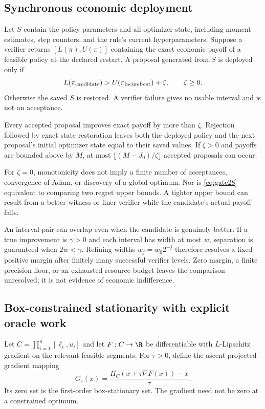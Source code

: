\subsection{Synchronous economic deployment}
Let $S$ contain the policy parameters and all optimizer state, including moment estimates, step counters, and the rule's current hyperparameters. Suppose a verifier returns $[L(\pi),U(\pi)]$ containing the exact economic payoff of a feasible policy at the declared restart. A proposal generated from $S$ is deployed only if
\begin{equation}\label{eq:gate28}
 L(\pi_{\rm candidate})>U(\pi_{\rm incumbent})+\zeta,
 \qquad\zeta\ge0.
\end{equation}
Otherwise the saved $S$ is restored. A verifier failure gives no usable interval and is not an acceptance.
\begin{proposition}\label{prop:gate28}
Every accepted proposal improves exact payoff by more than $\zeta$. Rejection followed by exact state restoration leaves both the deployed policy and the next proposal's initial optimizer state equal to their saved values. If $\zeta>0$ and payoffs are bounded above by $M$, at most $\lfloor(M-J_0)/\zeta\rfloor$ accepted proposals can occur.
\end{proposition}
For $\zeta=0$, monotonicity does not imply a finite number of acceptances, convergence of Adam, or discovery of a global optimum. Nor is \eqref{eq:gate28} equivalent to comparing two regret upper bounds. A tighter upper bound can result from a better witness or finer verifier while the candidate's actual payoff falls.

An interval pair can overlap even when the candidate is genuinely better. If a true improvement is $\gamma>0$ and each interval has width at most $w$, separation is guaranteed when $2w<\gamma$. Refining widths $w_j=w_0 2^{-j}$ therefore resolves a fixed positive margin after finitely many successful verifier levels. Zero margin, a finite precision floor, or an exhausted resource budget leaves the comparison unresolved; it is not evidence of economic indifference.

\subsection{Box-constrained stationarity with explicit oracle work}\label{sec:box28}
Let $C=\prod_{i=1}^n[\ell_i,u_i]$ and let $F:C\to\R$ be differentiable with $L$-Lipschitz gradient on the relevant feasible segments. For $\tau>0$, define the ascent projected-gradient mapping
\begin{equation}\label{eq:proj28}
 G_\tau(x)=\frac{\Pi_C(x+\tau\nabla F(x))-x}{\tau}.
\end{equation}
Its zero set is the first-order box-stationary set. The gradient need not be zero at a constrained optimum.

